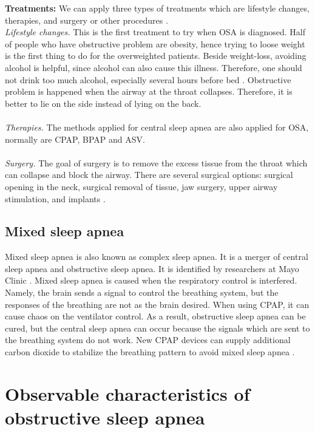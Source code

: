     \textbf{Treatments:} We can apply three types of treatments which are lifestyle changes, therapies, and surgery or other procedures \cite{MAYOCLINIC}.\\
    \textit{Lifestyle changes.}
    This is the first  treatment to try when OSA is diagnosed. Half of people who have obstructive problem are obesity, hence trying to loose weight is the first thing to do for the overweighted patients. Beside weight-loss, avoiding alcohol is helpful, since alcohol can also cause this illness. Therefore, one should not drink too much alcohol, especially several hours before bed \cite{MAYOCLINIC}. Obstructive problem is happened when the airway at the throat collapses. Therefore, it is better to lie on the side instead of lying on the back.\\\\
    \textit{Therapies.} The methods applied for central sleep apnea are also applied for OSA, normally are CPAP, BPAP and ASV.\\\\
    \textit{Surgery.}
    The goal of surgery is to remove the excess tissue from the throat which can collapse and block the airway. There are several surgical options: surgical opening in the neck, surgical removal of tissue, jaw surgery, upper airway stimulation, and implants \cite{MAYOCLINIC}.
\subsection{Mixed sleep apnea}
    Mixed sleep apnea is also known as complex sleep apnea. It is a merger of central sleep apnea and obstructive sleep apnea. It is identified by researchers at Mayo Clinic \cite{ScienceDaily}. Mixed sleep apnea is caused when the respiratory control is interfered. Namely, the brain sends a signal to control the breathing system, but the responses of the breathing are not as the brain desired. When using CPAP, it can cause chaos on the ventilator control. As a result, obstructive sleep apnea can be cured, but the central sleep apnea can occur because the signals which are sent to the breathing system do not work. New CPAP devices can supply additional carbon dioxide to stabilize the breathing pattern to avoid mixed sleep apnea \cite{Hindawi}.
\section{Observable characteristics of obstructive sleep apnea}


